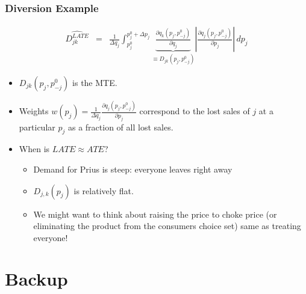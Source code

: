 \begin{frame}
\frametitle{Diversion Example}
\begin{eqnarray*}
\label{weighteddiversion}
\widehat{D_{jk}^{LATE} }&=& \frac{1}{\Delta q_j} \int_{p_j^{0}}^{p_j^{0}+\Delta p_j} \underbrace{\frac{\partial q_k(p_j,p^{0}_{-j})}{\partial q_j}}_{\equiv D_{jk}(p_j,p^{0}_{-j})} \left| \frac{\partial q_j(p_j,p^{0}_{-j})}{\partial p_j} \right|\, dp_j
\end{eqnarray*}
\begin{itemize}
\item $D_{jk}(p_j,p^{0}_{-j})$ is the MTE.
\item Weights $w(p_j) = \frac{1}{\Delta q_j} \frac{\partial q_j(p_j,p^{0}_{-j})}{\partial p_j}$ correspond to the lost sales of $j$ at a particular $p_j$ as a fraction of all lost sales.
\item When is $LATE \approx ATE$? 
\begin{itemize}
\item Demand for Prius is steep: everyone leaves right away
\item $D_{j,k}(p_j)$ is relatively flat.
\item We might want to think about raising the price to choke price (or eliminating the product from the consumers choice set) same as treating everyone!
\end{itemize}
\end{itemize}
\end{frame}

\begin{frame}[allowframebreaks]
  
  
\end{frame}

\section*{Backup}


